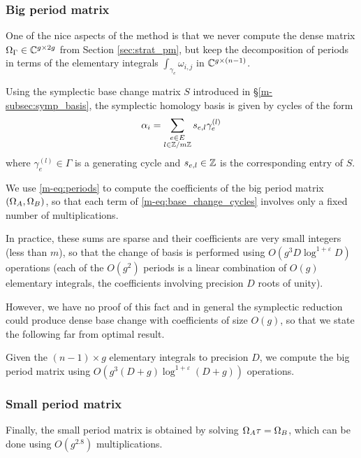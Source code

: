 \documentclass[main.tex]{subfiles}
\begin{document}
   \subsubsection{Big period matrix}

   One of the nice aspects of the method is that we never compute
   the dense matrix $\Omega_{\Gamma}\in\mathbb{C}^{g\times 2g}$ from Section \ref{sec:strat_pm}, but
   keep the decomposition of periods in terms of the elementary integrals
   $\int_{\gamma_e}\omega_{i,j}$ in $\mathbb{C}^{g\times (n-1)}$.

   Using the symplectic base change matrix $S$ introduced
   in \S \ref{m-subsec:symp_basis}, the symplectic homology basis is given
   by cycles of the form
   \begin{equation}
       \label{eq:base_change_cycles}
       \alpha_i = \sum_{\substack{e \in E \\ l\in\mathbb{Z}/m\mathbb{Z}}} s_{e,l}\gamma_e^{(l)}
   \end{equation}
   where $\gamma_e^{(l)} \in \Gamma$ is a generating cycle
   and $s_{e,l}\in\mathbb{Z}$ is the corresponding entry of $S$.

   We use \eqref{m-eq:periods} to compute the coefficients of the big period
   matrix $(\Omega_A,\Omega_B)$, so that each term of \eqref{m-eq:base_change_cycles}
   involves only a fixed number of multiplications.

   In practice, these sums are sparse and their coefficients are very small integers
   (less than $m$), so that the change of basis is performed using
   $O(g^3D\log^{1+\varepsilon}D)$ operations
   (each of the $O(g^2)$ periods is a linear combination of $O(g)$ elementary integrals,
   the coefficients involving precision $D$ roots of unity).

   However, we have no proof of this fact and in general the symplectic reduction
   could produce dense base change with coefficients of size $O(g)$,
   so that we state the following far from optimal result.
   \begin{thm}
       Given the $(n-1)\times g$ elementary integrals to precision $D$,
       we compute the big period matrix using $O(g^3(D+g)\log^{1+\varepsilon}(D+g))$ operations.
   \end{thm}

   \subsubsection{Small period matrix}

   Finally, the small period matrix is obtained by solving $\Omega_A\tau=\Omega_B$,
   which can be done using $O(g^{2.8})$ multiplications.
\end{document}
